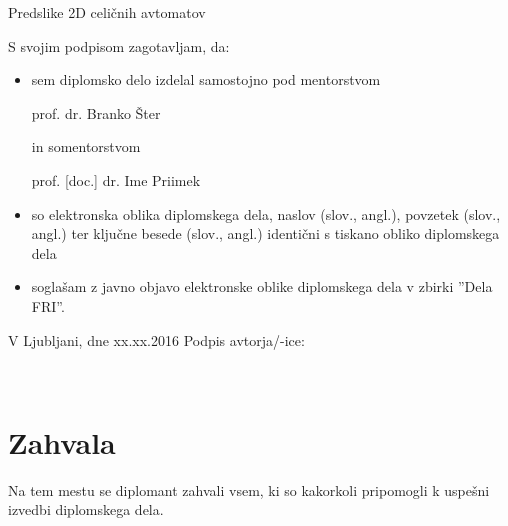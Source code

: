\documentclass[12pt,a4paper,openany,twoside]{book}
\begin{document}
\vspace{0.5cm}
Predslike 2D celičnih avtomatov

\vspace{1.5cm}
S svojim podpisom zagotavljam, da:
\begin{itemize}
	\item sem diplomsko delo izdelal samostojno pod mentorstvom 
	
	prof. dr. Branko Šter
	
	in somentorstvom 
	
	prof. [doc.] dr. Ime Priimek
	
	\item so elektronska oblika diplomskega dela, naslov (slov., angl.), povzetek (slov., angl.) ter ključne besede (slov., angl.) identični s tiskano obliko diplomskega dela
	\item soglašam z javno objavo elektronske oblike diplomskega dela v zbirki ''Dela FRI''.
\end{itemize}

\vspace{1cm}
V Ljubljani, dne xx.xx.2016 \hspace{1cm} Podpis avtorja/-ice:

\newpage 


\ \thispagestyle{empty}

\newpage



\chapter*{Zahvala}

\thispagestyle{empty}

Na tem mestu se diplomant zahvali vsem, ki so kakorkoli pripomogli k uspešni izvedbi diplomskega dela.


\newpage


\ \thispagestyle{empty}

\newpage


\thispagestyle{empty}
\end{document}
